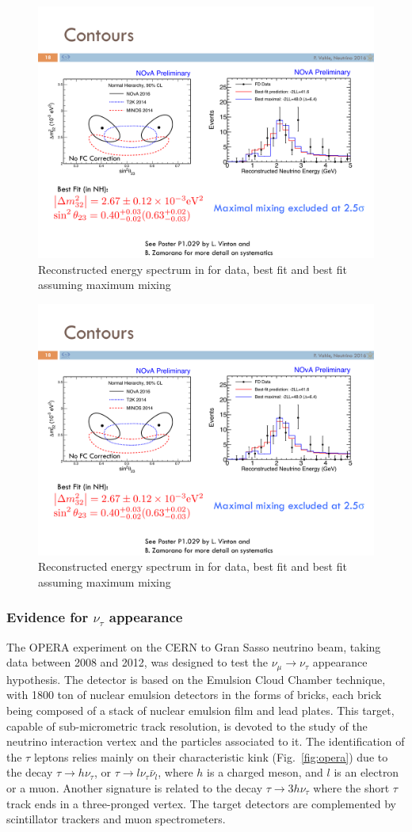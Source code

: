  \begin{figure}[htbp]
\centering
\includegraphics[width=0.6\linewidth]{figures/nova_comparison.pdf}
  \caption{Reconstructed energy spectrum in \nova for data, best fit and best fit assuming maximum mixing} \label{fig:atm-contour}
 \end{figure}

  \begin{figure}[htbp]
\centering
\includegraphics[width=0.6\linewidth]{figures/nova_comparison.pdf}
  \caption{Reconstructed energy spectrum in \nova for data, best fit and best fit assuming maximum mixing} \label{fig:atm-contour}
 \end{figure}

 
 
 
 \subsubsection{Evidence for $\nu_\tau$ appearance}

The OPERA experiment on the CERN to Gran Sasso neutrino beam, taking data between 2008 and 2012, was designed to test the $\nu_\mu \rightarrow \nu_\tau$ appearance hypothesis. The detector is based on the Emulsion Cloud Chamber technique, with 1800 ton of nuclear emulsion detectors in the forms of bricks, each brick being composed of a stack of nuclear emulsion film and lead plates. This target, capable of sub-micrometric track resolution, is devoted to the study of the neutrino interaction vertex and the particles associated to it. The identification of the $\tau$ leptons relies mainly on their characteristic kink (Fig.~\ref{fig:opera}) due to the decay $\tau \rightarrow h \nu_\tau$, or $\tau \rightarrow l \nu_\tau \bar \nu_l$, where $h$ is a charged meson, and $l$ is an electron or a muon. Another signature is related to the decay $\tau \rightarrow 3 h \nu_\tau$ where the short $\tau$ track ends in a three-pronged vertex. The target detectors are complemented by scintillator trackers and muon spectrometers. 

